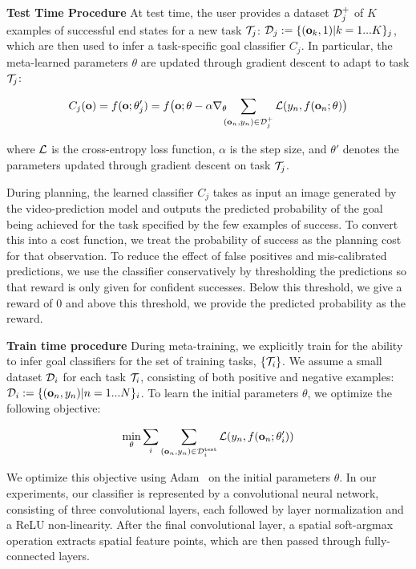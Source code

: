 \noindent \textbf{Test Time Procedure}
At test time, the user provides a dataset $\mathcal{D}^+_j$ of $K$ examples of successful end states for a new task $\mathcal{T}_j$: $\mathcal{D}_j:=\{(\mathbf{o}_k, 1) | k = 1...K\}_j$, which are then used to infer a task-specific goal classifier $C_j$. In particular, the meta-learned parameters $\theta$ are updated through gradient descent to adapt to task $\mathcal{T}_j$:

$$
C_j(\mathbf{o})
= f(\mathbf{o}; \theta_j')
= f\big(\mathbf{o}; \theta-\alpha \nabla_\theta \!\!\! \sum_{(\mathbf{o}_n, y_n)\in \mathcal{D}^+_j} \mathcal{L} (y_n, f(\mathbf{o}_n; \theta)\big)
$$

where $\mathcal{L}$ is the cross-entropy loss function, $\alpha$ is the step size, and $\theta'$ denotes the parameters updated through gradient descent on task $\mathcal{T}_j$.

During planning, the learned classifier $C_j$ takes as input an image generated by the video-prediction model and outputs the predicted probability of the goal being achieved for the task specified by the few examples of success. To convert this into a cost function, we treat the probability of success as the planning cost for that observation. To reduce the effect of false positives and mis-calibrated predictions, we use the classifier conservatively by thresholding the predictions so that reward is only given for confident successes. Below this threshold, we give a reward of 0 and above this threshold, we provide the predicted probability as the reward. %


\noindent \textbf{Train time procedure}
During meta-training, we explicitly train for the ability to infer goal classifiers for the set of training tasks, $\{ \mathcal{T}_i \}$. We assume a small dataset $\mathcal{D}_i$ for each task $\mathcal{T}_i$, consisting of both positive and negative examples: $\mathcal{D}_i:= \{(\mathbf{o}_n,y_n) | n=1...N \}_i$. To learn the initial parameters $\theta$, we optimize the following objective:

$$
\min_\theta \sum_i \sum_{(\mathbf{o}_n, y_n) \in \mathcal{D}^\text{test}_i} \mathcal{L}(y_n, f(\mathbf{o}_n; \theta_i')) 
$$

We optimize this objective using Adam~\cite{ADAM} on the initial parameters $\theta$. In our experiments, our classifier is represented by a convolutional neural network, consisting of three convolutional layers, each followed by layer normalization and a ReLU non-linearity. After the final convolutional layer, a spatial soft-argmax operation extracts spatial feature points, which are then passed through fully-connected layers.

